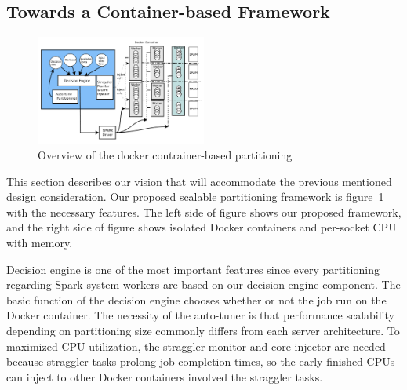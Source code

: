 \fi


\subsection{Towards a Container-based Framework}

\begin{figure}[h]
  \begin{center}
     \includegraphics[width=0.5\textwidth]{fig/jaildocker}
  \end{center}
  \caption{Overview of the docker contrainer-based
  partitioning}
  \label{fig:basic}
\end{figure}

This section describes our vision that will accommodate the previous
mentioned design consideration.
Our proposed scalable partitioning framework is figure~\ref{fig:basic} with the
necessary features.
The left side of figure shows our proposed framework, and the right side of
figure shows isolated Docker containers and per-socket CPU with memory.

Decision engine is one of the most important features
since every partitioning regarding Spark system workers are based
on our decision engine component.
The basic function of the decision engine chooses whether or not the job
run on the Docker container.
The necessity of the auto-tuner is that performance scalability depending on partitioning
size commonly differs from each server architecture.
To maximized CPU utilization, the straggler monitor and core injector are needed
because straggler tasks prolong job completion times, so the
early finished CPUs can inject to other Docker containers involved the straggler tasks.

